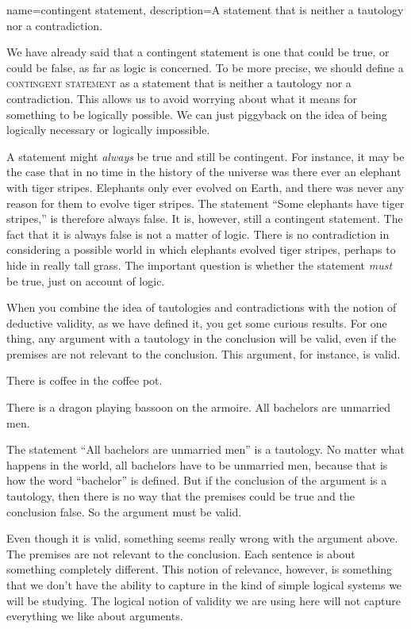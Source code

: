 {
name=contingent statement,
description={A statement that is neither a tautology nor a contradiction.}
}

We have already said that a contingent statement is one that could be true, or could be false, as far as logic is concerned. To be more precise, we should define a \textsc{\gls{contingent statement}}  \label{def:contingent_statement} as a statement that is neither a tautology nor a contradiction. This allows us to avoid worrying about what it means for something to be logically possible. We can just piggyback on the idea of being logically necessary or logically impossible. 

A statement might \emph{always} be true and still be contingent. For instance, it may be the case that in no time in the history of the universe was there ever an elephant with tiger stripes. Elephants only ever evolved on Earth, and there was never any reason for them to evolve tiger stripes. The statement ``Some elephants have tiger stripes,'' is therefore always false. It is, however, still a contingent statement. The fact that it is always false is not a matter of logic. There is no contradiction in considering a possible world in which elephants evolved tiger stripes, perhaps to hide in really tall grass. The important question is whether the statement \emph{must} be true, just on account of logic.

When you combine the idea of tautologies and contradictions with the notion of deductive validity, as we have defined it, you get some curious results. For one thing, any argument with a tautology in the conclusion will be valid, even if the premises are not relevant to the conclusion. This argument, for instance, is valid.

\begin{earg*}
\item There is coffee in the coffee pot.
\item There is a dragon playing bassoon on the armoire.
\itemc All bachelors are unmarried men.
\end{earg*}

The statement ``All bachelors are unmarried men'' is a tautology. No matter what happens in the world, all bachelors have to be unmarried men, because that is how the word ``bachelor'' is defined. But if the conclusion of the argument is a tautology, then there is no way that the premises could be true and the conclusion false. So the argument must be valid.

Even though it is valid, something seems really wrong with the argument above. The premises are not relevant to the conclusion. Each sentence is about something completely different. This notion of relevance, however, is something that we don't have the ability to capture in the kind of simple logical systems we will be studying. The logical notion of validity we are using here will not capture everything we like about arguments.

